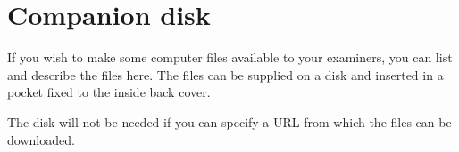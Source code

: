 \documentclass[12pt,openany,a4paper]{book}
\begin{document}
\chapter{Companion disk}

If you wish to make some computer files available to your examiners,
you can list and describe the files here.  The files can be supplied
on a disk and inserted in a pocket fixed to the inside back cover.

The disk will not be needed if you can specify a URL from which the
files can be downloaded.

\cleardoublepage











\end{document}
